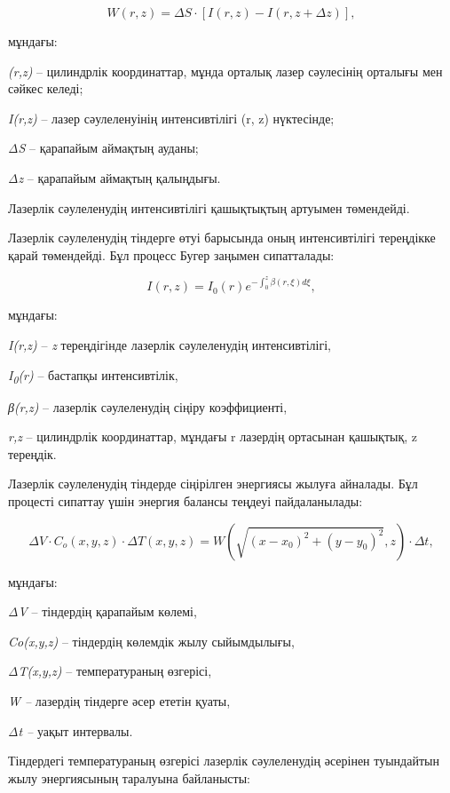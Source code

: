 \begin{equation}
W(r,z) = \Delta S \cdot \left\lbrack I(r,z) - I(r,z + \Delta z) \right\rbrack,
\end{equation}

\begin{multicols}{2}

мұндағы:

\emph{(r,z)} -- цилиндрлік координаттар, мұнда орталық лазер сәулесінің
орталығы мен сәйкес келеді;

\emph{I(r,z)} -- лазер сәулеленуінің интенсивтілігі (r, z) нүктесінде;

\emph{ΔS} -- қарапайым аймақтың ауданы;

\emph{Δz} -- қарапайым аймақтың қалыңдығы.

Лазерлік сәулеленудің интенсивтілігі қашықтықтың артуымен төмендейді.

Лазерлік сәулеленудің тіндерге өтуі барысында оның интенсивтілігі
тереңдікке қарай төмендейді. Бұл процесс Бугер заңымен сипатталады:

\begin{equation}
I(r,z) = I_{0}(r)e^{- \int_{0}^{z}{\beta(r,\xi)d\xi}},
\end{equation}

мұндағы:

\emph{I(r,z)} -- \emph{z} тереңдігінде лазерлік сәулеленудің
интенсивтілігі,

\emph{I\textsubscript{0}(r)} -- бастапқы интенсивтілік,

\emph{β(r,z)} -- лазерлік сәулеленудің сіңіру коэффициенті,

\emph{r,z} -- цилиндрлік координаттар, мұндағы r лазердің ортасынан
қашықтық, z тереңдік.

Лазерлік сәулеленудің тіндерде сіңірілген энергиясы жылуға айналады. Бұл
процесті сипаттау үшін энергия балансы теңдеуі пайдаланылады:
\end{multicols}

\begin{equation}
\Delta V \cdot C_{o}(x,y,z) \cdot \Delta T(x,y,z) = W\left( \sqrt{\left( x - x_{0} \right)^{2} + \left( y - y_{0} \right)^{2}},z \right) \cdot \Delta t,
\end{equation}

\begin{multicols}{2}
мұндағы:

\emph{ΔV} -- тіндердің қарапайым көлемі,

\emph{Co(x,y,z)} -- тіндердің көлемдік жылу сыйымдылығы,

\emph{ΔT(x,y,z)} -- температураның өзгерісі,

\emph{W --} лазердің тіндерге әсер ететін қуаты,

\emph{Δt --} уақыт интервалы.

Тіндердегі температураның өзгерісі лазерлік сәулеленудің әсерінен
туындайтын жылу энергиясының таралуына байланысты:
\end{multicols}


